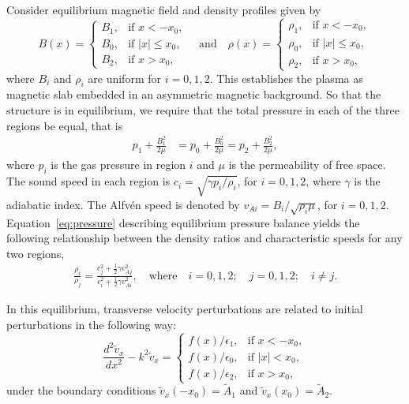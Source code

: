 \documentclass{aastex61}
\begin{document}
Consider equilibrium magnetic field and density profiles given by
\begin{equation}
B(x)=
\begin{cases}
B_1, & \text{if  }x<-x_0, \\
B_0, & \text{if }|x|\leq{x_0}, \\
B_2, & \text{if  }x>x_0,
\end{cases}
\quad \text{and} \quad
\rho(x)=
\begin{cases}
\rho_1, & \text{if  }x<-x_0, \\
\rho_0, & \text{if }|x|\leq{x_0}, \\
\rho_2, & \text{if  }x>x_0,
\end{cases}
\end{equation}
where $B_i$ and $\rho_i$ are uniform for $i = 0,1,2$. This establishes the plasma as magnetic slab embedded in an asymmetric magnetic background. So that the structure is in equilibrium, we require that the total pressure in each of the three regions be equal, that is
\begin{align}
p_1 + \frac{B_1^2}{2\mu} &= p_0  + \frac{B_0^2 }{2\mu} = p_2 + \frac{B_2^2 }{2\mu}, \label{eq:pressure}
\end{align}
where $p_i$ is the gas pressure in region $i$ and $\mu$ is the permeability of free space. The sound speed in each region is $c_i = \sqrt{\gamma p_i / \rho_i}$, for $i = 0, 1, 2$, where $\gamma$ is the adiabatic index. The Alfvén speed is denoted by $v_{Ai}= B_i/\sqrt{\rho_i \mu}$, for $i=0,1,2$. Equation~\ref{eq:pressure} describing equilibrium pressure balance yields the following relationship between the density ratios and characteristic speeds for any two regions,
\begin{align}
\frac{\rho_i}{\rho_j}= \frac{c_j^2 + \frac{1}{2} \gamma v_{Aj}^2}{c_i^2 + \frac{1}{2} \gamma v_{Ai}^2}, \quad \text{where} \quad i=0,1,2; \quad j=0,1,2; \quad i \neq j. \label{eq:ratio}
\end{align}

In this equilibrium, transverse velocity perturbations are related to initial perturbations in the following way:
\begin{equation}
\frac{d^2\tilde{v}_x}{dx^2} - k^2\tilde{v}_x = 
\begin{cases}
f(x)/\epsilon_1, & \text{if  } x<-x_0,\\
f(x)/\epsilon_0, & \text{if  } |x|<x_0,\\
f(x)/\epsilon_2, & \text{if  } x>x_0,
\end{cases}
\label{ivp gov slab 2}
\end{equation}
under the boundary conditions $\tilde{v}_x(-x_0) = \tilde{A}_1$ and $\tilde{v}_x(x_0) = \tilde{A}_2$.
\end{document}
